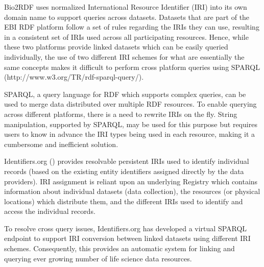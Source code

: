 \documentclass{bioinfo}
\begin{document}
Bio2RDF uses normalized International Resource Identifier (IRI) into its own domain name to support queries across datasets.
Datasets that are part of the EBI RDF platform follow a set of rules regarding the IRIs they can use, resulting in a consistent set of IRIs used across all participating resources. Hence, while these two platforms provide linked datasets which can be easily queried individually, the use of two different IRI schemes for what are essentially the same concepts makes it difficult to perform cross platform queries using SPARQL (http://www.w3.org/TR/rdf-sparql-query/).  

SPARQL, a query language for RDF which supports complex queries, can be used to merge data distributed over multiple RDF resources. To enable querying across different platforms, there is a need to rewrite IRIs on the fly. 
String manipulation, supported by SPARQL, may be used for this purpose but requires users to know in advance the IRI types being used in each resource, making it a cumbersome and inefficient solution. 

Identifiers.org (\cite{Juty01012012}) provides resolvable persistent IRIs used to identify individual records (based on the existing entity identifiers assigned directly by the data providers). IRI assignment is reliant upon an underlying Registry which contains information about individual datasets (data collection), the resources (or physical locations) which distribute them, and the different IRIs used to identify and access the individual records.

To resolve cross query issues, Identifiers.org has developed a virtual SPARQL endpoint to support IRI conversion between linked datasets using different IRI schemes. Consequently, this provides an automatic system for linking and querying ever growing number of life science data resources.
\end{document}
